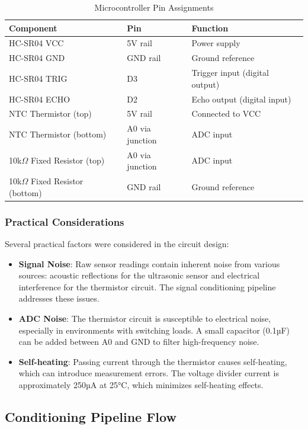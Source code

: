 \begin{table}[H]
\centering
\caption{Microcontroller Pin Assignments}
\label{tab:pin_connections}
\begin{tabular}{|l|l|l|}
\hline
\textbf{Component} & \textbf{Pin} & \textbf{Function} \\ \hline
HC-SR04 VCC & 5V rail & Power supply \\ \hline
HC-SR04 GND & GND rail & Ground reference \\ \hline
HC-SR04 TRIG & D3 & Trigger input (digital output) \\ \hline
HC-SR04 ECHO & D2 & Echo output (digital input) \\ \hline
NTC Thermistor (top) & 5V rail & Connected to VCC \\ \hline
NTC Thermistor (bottom) & A0 via junction & ADC input \\ \hline
10k$\Omega$ Fixed Resistor (top) & A0 via junction & ADC input \\ \hline
10k$\Omega$ Fixed Resistor (bottom) & GND rail & Ground reference \\ \hline
\end{tabular}
\end{table}

\subsubsection{Practical Considerations}
Several practical factors were considered in the circuit design:
\begin{itemize}
    \item \textbf{Signal Noise}: Raw sensor readings contain inherent noise from various sources: acoustic reflections for the ultrasonic sensor and electrical interference for the thermistor circuit. The signal conditioning pipeline addresses these issues.
    \item \textbf{ADC Noise}: The thermistor circuit is susceptible to electrical noise, especially in environments with switching loads. A small capacitor (0.1µF) can be added between A0 and GND to filter high-frequency noise.
    \item \textbf{Self-heating}: Passing current through the thermistor causes self-heating, which can introduce measurement errors. The voltage divider current is approximately 250µA at 25°C, which minimizes self-heating effects.
\end{itemize}

\subsection{Conditioning Pipeline Flow}

